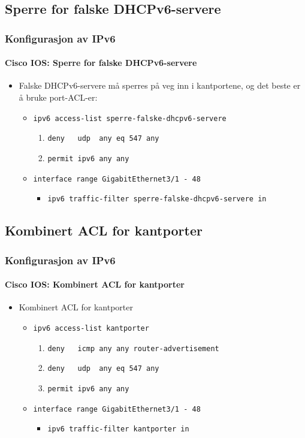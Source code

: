 \subsection{Sperre for falske DHCPv6-servere}
\begin{frame}
  \frametitle{Konfigurasjon av IPv6}
  \framesubtitle{Cisco IOS: Sperre for falske DHCPv6-servere}
  \begin{itemize}
  \item Falske DHCPv6-servere må sperres på veg \alert{inn i
      kantportene}, og det beste er å bruke port-ACL-er:
    \begin{itemize}
    \item \texttt{ipv6 access-list sperre-falske-dhcpv6-servere}
      \begin{enumerate}
      \item \texttt{deny\ \ \ udp\ \ any eq 547           any}
      \item \texttt{permit    ipv6   any \phantom{eq 547} any}
      \end{enumerate}
    \item \texttt{interface range GigabitEthernet3/1 - 48}
      \begin{itemize}
      \item \texttt{ipv6 traffic-filter sperre-falske-dhcpv6-servere in}
      \end{itemize}
    \end{itemize}
  \end{itemize}
\end{frame}

\subsection{Kombinert ACL for kantporter}
\begin{frame}
  \frametitle{Konfigurasjon av IPv6}
  \framesubtitle{Cisco IOS: Kombinert ACL for kantporter}
  \begin{itemize}
  \item Kombinert ACL for kantporter
    \begin{itemize}
    \item \texttt{ipv6 access-list kantporter}
      \begin{enumerate}
      \item \texttt{deny\ \ \ icmp   any \phantom{eq 547} any router-advertisement}
      \item \texttt{deny\ \ \ udp\ \ any eq 547           any}
      \item \texttt{permit    ipv6   any \phantom{eq 547} any}
      \end{enumerate}
    \item \texttt{interface range GigabitEthernet3/1 - 48}
      \begin{itemize}
      \item \texttt{ipv6 traffic-filter kantporter in}
      \end{itemize}
    \end{itemize}
  \end{itemize}
\end{frame}

